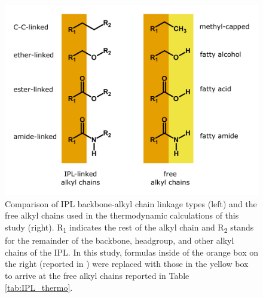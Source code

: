 \singlespace
\begin{figure}[h]
\centering
\includegraphics[width=\linewidth]{"figs_ch2/linked vs free alkyl chains"}
\caption[Comparison of IPL backbone-alkyl chain linkage types and the free alkyl chains used in thermodynamic calculations]{Comparison of IPL backbone-alkyl chain linkage types (left) and the free alkyl chains used in the thermodynamic calculations of this study (right). R\textsubscript{1} indicates the rest of the alkyl chain and R\textsubscript{2} stands for the remainder of the backbone, headgroup, and other alkyl chains of the IPL. In this study, formulas inside of the orange box on the right (reported in \cite{boyer2018thermophile}) were replaced with those in the yellow box to arrive at the free alkyl chains reported in Table \ref{tab:IPL_thermo}.}
\label{fig:linked_vs_free_chain}
\end{figure}
\doublespace





